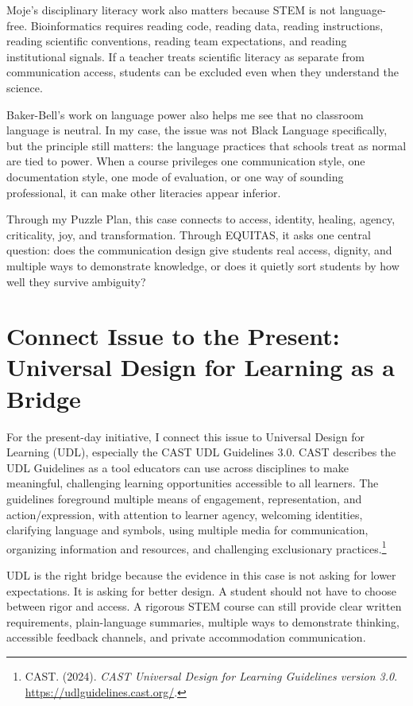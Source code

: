 \documentclass[12pt]{article}
\begin{document}
Moje's disciplinary literacy work also matters because STEM is not language-free. Bioinformatics requires reading code, reading data, reading instructions, reading scientific conventions, reading team expectations, and reading institutional signals. If a teacher treats scientific literacy as separate from communication access, students can be excluded even when they understand the science.

Baker-Bell's work on language power also helps me see that no classroom language is neutral. In my case, the issue was not Black Language specifically, but the principle still matters: the language practices that schools treat as normal are tied to power. When a course privileges one communication style, one documentation style, one mode of evaluation, or one way of sounding professional, it can make other literacies appear inferior.

Through my Puzzle Plan, this case connects to access, identity, healing, agency, criticality, joy, and transformation. Through EQUITAS, it asks one central question: does the communication design give students real access, dignity, and multiple ways to demonstrate knowledge, or does it quietly sort students by how well they survive ambiguity?

\section*{Connect Issue to the Present: Universal Design for Learning as a Bridge}

For the present-day initiative, I connect this issue to Universal Design for Learning (UDL), especially the CAST UDL Guidelines 3.0. CAST describes the UDL Guidelines as a tool educators can use across disciplines to make meaningful, challenging learning opportunities accessible to all learners. The guidelines foreground multiple means of engagement, representation, and action/expression, with attention to learner agency, welcoming identities, clarifying language and symbols, using multiple media for communication, organizing information and resources, and challenging exclusionary practices.\footnote{CAST. (2024). \textit{CAST Universal Design for Learning Guidelines version 3.0}. \url{https://udlguidelines.cast.org/}.}

UDL is the right bridge because the evidence in this case is not asking for lower expectations. It is asking for better design. A student should not have to choose between rigor and access. A rigorous STEM course can still provide clear written requirements, plain-language summaries, multiple ways to demonstrate thinking, accessible feedback channels, and private accommodation communication.
\end{document}
